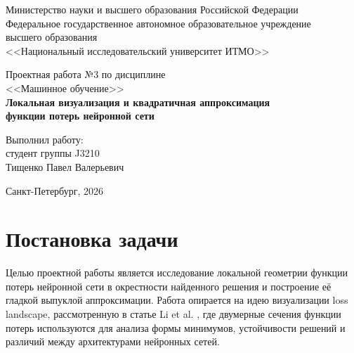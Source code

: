 \documentclass[12pt,a4paper]{article}
\begin{document}
\begin{titlepage}
    \begin{center}
        Министерство науки и высшего образования Российской Федерации\\
        Федеральное государственное автономное образовательное учреждение\\
        высшего образования\\
        <<Национальный исследовательский университет ИТМО>>

        \vspace{3cm}

        {\Large Проектная работа №3 по дисциплине}\\[0.3cm]
        {\Large <<Машинное обучение>>}\\[1.2cm]

        {\LARGE \textbf{Локальная визуализация и квадратичная аппроксимация}}\\[0.2cm]
        {\LARGE \textbf{функции потерь нейронной сети}}\\[0.5cm]

        \vspace{2.5cm}

        \begin{flushright}
            Выполнил работу:\\
            студент группы J3210\\
            Тищенко Павел Валерьевич
        \end{flushright}

        \vfill

        Санкт-Петербург, 2026
    \end{center}
\end{titlepage}

\tableofcontents
\newpage

\section{Постановка задачи}

Целью проектной работы является исследование локальной геометрии функции потерь нейронной сети в окрестности найденного решения и построение её гладкой выпуклой аппроксимации. Работа опирается на идею визуализации loss landscape, рассмотренную в статье Li et al. \cite{li2018visualizing}, где двумерные сечения функции потерь используются для анализа формы минимумов, устойчивости решений и различий между архитектурами нейронных сетей.
\end{document}
